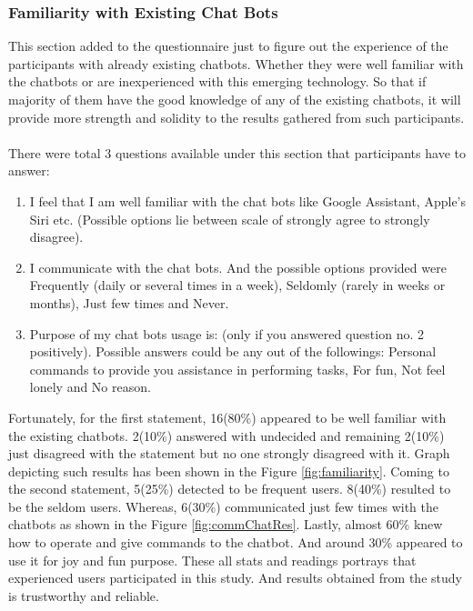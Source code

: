 \subsubsection*{Familiarity with Existing Chat Bots}
This section added to the questionnaire just to figure out the experience of the participants with already existing chatbots. Whether they were well familiar with the chatbots or are inexperienced with this emerging technology. So that if majority of them have the good knowledge of any of the existing chatbots, it will provide more strength and solidity to the results gathered from such participants.
\\~\\
There were total 3 questions available under this section that participants have to answer:
\begin{enumerate}
    \item I feel that I am well familiar with the chat bots like Google Assistant, Apple's Siri etc. (Possible options lie between scale of strongly agree to strongly disagree).
    \item I communicate with the chat bots. And the possible options provided were Frequently (daily or several times in a week), Seldomly (rarely in weeks or months), Just few times and Never.
    \item Purpose of my chat bots usage is: (only if you answered question no. 2 positively). Possible answers could be any out of the followings: Personal commands to provide you assistance in performing tasks, For fun, Not feel lonely and No reason.
\end{enumerate}
Fortunately, for the first statement, 16(80\%) appeared to be well familiar with the existing chatbots. 2(10\%) answered with undecided and remaining 2(10\%) just disagreed with the statement but no one strongly disagreed with it. Graph depicting such results has been shown in the Figure \ref{fig:familiarity}. Coming to the second statement, 5(25\%) detected to be frequent users. 8(40\%) resulted to be the seldom users. Whereas, 6(30\%) communicated just few times with the chatbots as shown in the Figure \ref{fig:commChatRes}. Lastly, almost 60\% knew how to operate and give commands to the chatbot. And around 30\% appeared to use it for joy and fun purpose. These all stats and readings portrays that experienced users participated in this study. And results obtained from the study is trustworthy and reliable. 

